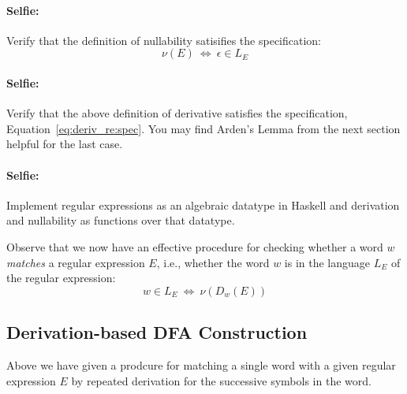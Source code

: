 \paragraph{Selfie:} 
Verify that the definition of nullability satisifies the specification:
\begin{equation*}
	\nu(E) ~\Leftrightarrow~ \epsilon \in L_E
\end{equation*}

\paragraph{Selfie:} 
Verify that the above definition of derivative satisfies the specification, Equation~\ref{eq:deriv_re:spec}. 
You may find Arden's Lemma from the next section helpful for the last case.

\paragraph{Selfie:} 
Implement regular expressions as an algebraic datatype in Haskell and 
derivation and nullability as functions over that datatype.


Observe that we now have an effective procedure for checking whether a word $w$
\emph{matches} a regular expression $E$, i.e., whether the word $w$ is in the language
$L_E$ of the regular expression:
\begin{equation*}
	w \in L_E ~\Leftrightarrow~ \nu(D_w(E))
\end{equation*}

\subsection{Derivation-based DFA Construction}

Above we have given a prodcure for matching a single word with a given regular
expression $E$ by repeated derivation for the successive symbols in the word. 

